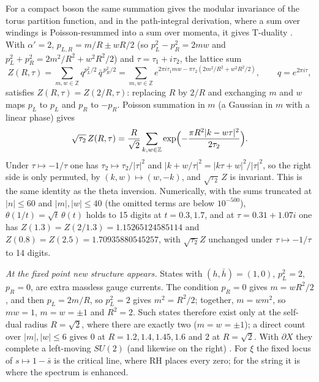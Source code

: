 \documentclass[11pt]{article}
\theoremstyle{definition}\newtheorem{definition}[theorem]{Definition}
\theoremstyle{remark}\newtheorem{remark}[theorem]{Remark}
\begin{document}
For a compact boson the same summation gives the modular invariance of the torus partition function, and in the path-integral derivation, where a sum over windings is Poisson-resummed into a sum over momenta, it gives T-duality \cite[Ch.~8]{Polchinski}. With $\alpha'=2$, $p_{L,R}=m/R\pm wR/2$ (so $p_L^2-p_R^2=2mw$ and $p_L^2+p_R^2=2m^2/R^2+w^2R^2/2$) and $\tau=\tau_1+i\tau_2$, the lattice sum
\[
Z(R,\tau)=\sum_{m,w\in\mathbb Z}q^{p_L^2/2}\,\bar q^{\,p_R^2/2}=\sum_{m,w\in\mathbb Z}e^{2\pi i\tau_1mw-\pi\tau_2(2m^2/R^2+w^2R^2/2)},\qquad q=e^{2\pi i\tau},
\]
satisfies $Z(R,\tau)=Z(2/R,\tau)$: replacing $R$ by $2/R$ and exchanging $m$ and $w$ maps $p_L$ to $p_L$ and $p_R$ to $-p_R$. Poisson summation in $m$ (a Gaussian in $m$ with a linear phase) gives
\[
\sqrt{\tau_2}\,Z(R,\tau)=\frac R{\sqrt2}\sum_{k,w\in\mathbb Z}\exp\Bigl(-\frac{\pi R^2|k-w\tau|^2}{2\tau_2}\Bigr).
\]
Under $\tau\mapsto-1/\tau$ one has $\tau_2\mapsto\tau_2/|\tau|^2$ and $|k+w/\tau|^2=|k\tau+w|^2/|\tau|^2$, so the right side is only permuted, by $(k,w)\mapsto(w,-k)$, and $\sqrt{\tau_2}\,Z$ is invariant. This is the same identity as the theta inversion. Numerically, with the sums truncated at $|n|\le60$ and $|m|,|w|\le40$ (the omitted terms are below $10^{-500}$), $\theta(1/t)=\sqrt t\,\theta(t)$ holds to 15 digits at $t=0.3,1.7$, and at $\tau=0.31+1.07i$ one has $Z(1.3)=Z(2/1.3)=1.15265124585114$ and $Z(0.8)=Z(2.5)=1.70935880545257$, with $\sqrt{\tau_2}Z$ unchanged under $\tau\mapsto-1/\tau$ to 14 digits.

\emph{At the fixed point new structure appears.} States with $(h,\bar h)=(1,0)$, $p_L^2=2$, $p_R=0$, are extra massless gauge currents. The condition $p_R=0$ gives $m=wR^2/2$, and then $p_L=2m/R$, so $p_L^2=2$ gives $m^2=R^2/2$; together, $m=wm^2$, so $mw=1$, $m=w=\pm1$ and $R^2=2$. Such states therefore exist only at the self-dual radius $R=\sqrt2$, where there are exactly two ($m=w=\pm1$); a direct count over $|m|,|w|\le6$ gives $0$ at $R=1.2,1.4,1.45,1.6$ and $2$ at $R=\sqrt2$. With $\partial X$ they complete a left-moving $SU(2)$ (and likewise on the right) \cite[Ch.~8]{Polchinski}. For $\xi$ the fixed locus of $s\mapsto1-\bar s$ is the critical line, where RH places every zero; for the string it is where the spectrum is enhanced.
\end{document}
